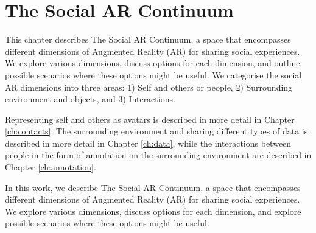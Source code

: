 \chapter{The Social AR Continuum} %
\label{ch:continuum} %

This chapter describes The Social AR Continuum, a space that encompasses different dimensions of Augmented Reality (AR) for sharing social experiences. We explore various dimensions, discuss options for each dimension, and outline possible scenarios where these options might be useful. We categorise the social AR dimensions into three areas: 1) Self and others or people, 2) Surrounding environment and objects, and 3) Interactions.

Representing self and others as avatars is described in more detail in Chapter \ref{ch:contacts}. The surrounding environment and sharing different types of data is described in more detail in Chapter \ref{ch:data}, while the interactions between people in the form of annotation on the surrounding environment are described in Chapter \ref{ch:annotation}.




In this work, we describe The Social AR Continuum, a space that encompasses different dimensions of Augmented Reality (AR) for sharing social experiences. We explore various dimensions, discuss options for each dimension, and explore possible scenarios where these options might be useful. 

